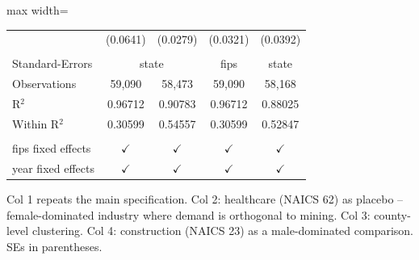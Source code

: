 \begin{table}[htbp]
\begin{adjustbox}{max width=\textwidth}
\begin{tabular}{lcccc}
                                                        & (0.0641)          & (0.0279)             & (0.0321)        & (0.0392)\\   
       \\
      Standard-Errors & \multicolumn{2}{c}{state} & fips & state \\ 
      Observations                                      & 59,090            & 58,473               & 59,090          & 58,168\\  
      R$^2$                                             & 0.96712           & 0.90783              & 0.96712         & 0.88025\\  
      Within R$^2$                                      & 0.30599           & 0.54557              & 0.30599         & 0.52847\\  
       \\
      fips fixed effects                                & $\checkmark$      & $\checkmark$         & $\checkmark$    & $\checkmark$\\   
      year fixed effects                                & $\checkmark$      & $\checkmark$         & $\checkmark$    & $\checkmark$\\   
      \bottomrule
   \end{tabular}
   \end{adjustbox}

   \par \raggedright \small 
   Col 1 repeats the main specification. Col 2: healthcare (NAICS 62) as placebo -- female-dominated industry where demand is orthogonal to mining. Col 3: county-level clustering. Col 4: construction (NAICS 23) as a male-dominated comparison. SEs in parentheses.
\end{table}


